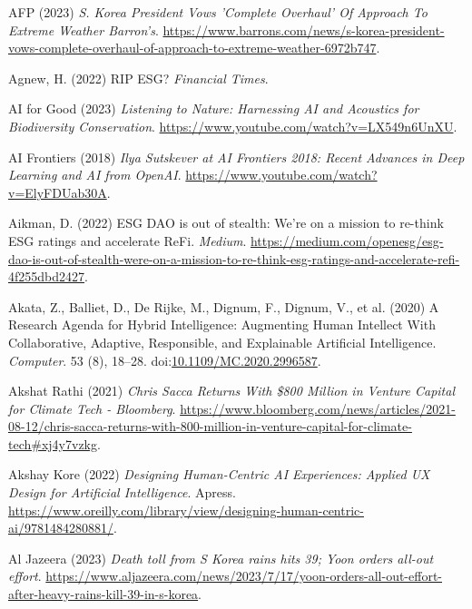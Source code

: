\documentclass[
  letterpaper,
  DIV=11,
  numbers=noendperiod]{scrartcl}
\newlength{\cslhangindent}
\newenvironment{CSLReferences}[2] %
 {\begin{list}{}{%
  \setlength{\itemindent}{0pt}
  \setlength{\leftmargin}{0pt}
  \setlength{\parsep}{0pt}
  \ifodd #1
   \setlength{\leftmargin}{\cslhangindent}
   \setlength{\itemindent}{-1\cslhangindent}
  \fi
  \setlength{\itemsep}{#2\baselineskip}}}
 {\end{list}}
\begin{document}
\begin{CSLReferences}{0}{1}
AFP (2023) \emph{S. {Korea President Vows} '{Complete Overhaul}' {Of
Approach To Extreme Weather} {\textbar} {Barron}'s}.
\url{https://www.barrons.com/news/s-korea-president-vows-complete-overhaul-of-approach-to-extreme-weather-6972b747}.

Agnew, H. (2022) {RIP ESG}? \emph{Financial Times}.

AI for Good (2023) \emph{Listening to {Nature}: {Harnessing AI} and
{Acoustics} for {Biodiversity Conservation}}.
\url{https://www.youtube.com/watch?v=LX549n6UnXU}.

AI Frontiers (2018) \emph{Ilya {Sutskever} at {AI Frontiers} 2018:
{Recent Advances} in {Deep Learning} and {AI} from {OpenAI}}.
\url{https://www.youtube.com/watch?v=ElyFDUab30A}.

Aikman, D. (2022) {ESG DAO} is out of stealth: We're on a mission to
re-think {ESG} ratings and accelerate {ReFi}. \emph{Medium}.
\url{https://medium.com/openesg/esg-dao-is-out-of-stealth-were-on-a-mission-to-re-think-esg-ratings-and-accelerate-refi-4f255dbd2427}.

Akata, Z., Balliet, D., De Rijke, M., Dignum, F., Dignum, V., et al.
(2020) A {Research Agenda} for {Hybrid Intelligence}: {Augmenting Human
Intellect With Collaborative}, {Adaptive}, {Responsible}, and
{Explainable Artificial Intelligence}. \emph{Computer}. 53 (8), 18--28.
doi:\href{https://doi.org/10.1109/MC.2020.2996587}{10.1109/MC.2020.2996587}.

Akshat Rathi (2021) \emph{Chris {Sacca Returns With} \$800 {Million} in
{Venture Capital} for {Climate Tech} - {Bloomberg}}.
\url{https://www.bloomberg.com/news/articles/2021-08-12/chris-sacca-returns-with-800-million-in-venture-capital-for-climate-tech\#xj4y7vzkg}.

Akshay Kore (2022) \emph{Designing {Human-Centric AI Experiences}:
{Applied UX Design} for {Artificial Intelligence}}. Apress.
\url{https://www.oreilly.com/library/view/designing-human-centric-ai/9781484280881/}.

Al Jazeera (2023) \emph{Death toll from {S Korea} rains hits 39; {Yoon}
orders all-out effort}.
\url{https://www.aljazeera.com/news/2023/7/17/yoon-orders-all-out-effort-after-heavy-rains-kill-39-in-s-korea}.


\end{CSLReferences}
\end{document}
